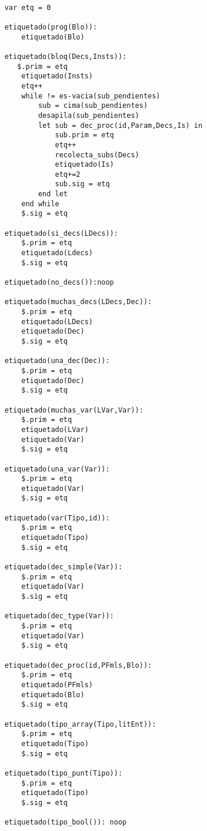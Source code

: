 \begin{lstlisting}

    var etq = 0 

    etiquetado(prog(Blo)):
        etiquetado(Blo)

    etiquetado(bloq(Decs,Insts)):
       $.prim = etq
        etiquetado(Insts)
        etq++
        while != es-vacia(sub_pendientes)
            sub = cima(sub_pendientes)
            desapila(sub_pendientes)
            let sub = dec_proc(id,Param,Decs,Is) in
                sub.prim = etq
                etq++
                recolecta_subs(Decs)
                etiquetado(Is)
                etq+=2
                sub.sig = etq
            end let
        end while
        $.sig = etq
    
    etiquetado(si_decs(LDecs)):
        $.prim = etq
        etiquetado(Ldecs)
        $.sig = etq
    
    etiquetado(no_decs()):noop
    
    etiquetado(muchas_decs(LDecs,Dec)):
        $.prim = etq
        etiquetado(LDecs)
        etiquetado(Dec)
        $.sig = etq
    
    etiquetado(una_dec(Dec)):
        $.prim = etq
        etiquetado(Dec)
        $.sig = etq

    etiquetado(muchas_var(LVar,Var)):
        $.prim = etq
        etiquetado(LVar)
        etiquetado(Var)
        $.sig = etq

    etiquetado(una_var(Var)):
        $.prim = etq
        etiquetado(Var)
        $.sig = etq
    
    etiquetado(var(Tipo,id)):
        $.prim = etq
        etiquetado(Tipo)
        $.sig = etq
    
    etiquetado(dec_simple(Var)):
        $.prim = etq
        etiquetado(Var)
        $.sig = etq

    etiquetado(dec_type(Var)):
        $.prim = etq
        etiquetado(Var)
        $.sig = etq
    
    etiquetado(dec_proc(id,PFmls,Blo)):
        $.prim = etq
        etiquetado(PFmls)
        etiquetado(Blo)
        $.sig = etq

    etiquetado(tipo_array(Tipo,litEnt)):
        $.prim = etq
        etiquetado(Tipo)
        $.sig = etq

    etiquetado(tipo_punt(Tipo)):
        $.prim = etq
        etiquetado(Tipo)
        $.sig = etq

    etiquetado(tipo_bool()): noop


\end{lstlisting}
